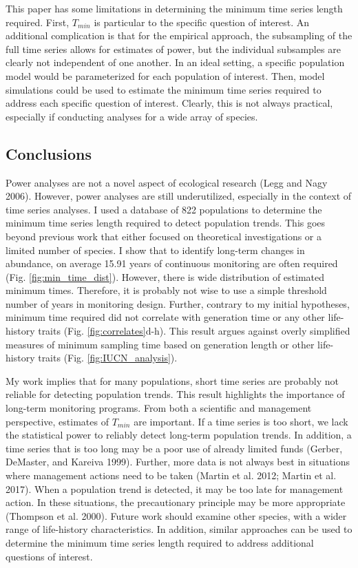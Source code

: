 \documentclass[12pt,]{article}
\begin{document}
This paper has some limitations in determining the minimum time series
length required. First, \(T_{min}\) is particular to the specific
question of interest. An additional complication is that for the
empirical approach, the subsampling of the full time series allows for
estimates of power, but the individual subsamples are clearly not
independent of one another. In an ideal setting, a specific population
model would be parameterized for each population of interest. Then,
model simulations could be used to estimate the minimum time series
required to address each specific question of interest. Clearly, this is
not always practical, especially if conducting analyses for a wide array
of species.

\subsection{Conclusions}\label{conclusions}

Power analyses are not a novel aspect of ecological research (Legg and
Nagy 2006). However, power analyses are still underutilized, especially
in the context of time series analyses. I used a database of 822
populations to determine the minimum time series length required to
detect population trends. This goes beyond previous work that either
focused on theoretical investigations or a limited number of species. I
show that to identify long-term changes in abundance, on average 15.91
years of continuous monitoring are often required (Fig.
\ref{fig:min_time_dist}). However, there is wide distribution of
estimated minimum times. Therefore, it is probably not wise to use a
simple threshold number of years in monitoring design. Further, contrary
to my initial hypotheses, minimum time required did not correlate with
generation time or any other life-history traits (Fig.
\ref{fig:correlates}d-h). This result argues against overly simplified
measures of minimum sampling time based on generation length or other
life-history traits (Fig. \ref{fig:IUCN_analysis}).

My work implies that for many populations, short time series are
probably not reliable for detecting population trends. This result
highlights the importance of long-term monitoring programs. From both a
scientific and management perspective, estimates of \(T_{min}\) are
important. If a time series is too short, we lack the statistical power
to reliably detect long-term population trends. In addition, a time
series that is too long may be a poor use of already limited funds
(Gerber, DeMaster, and Kareiva 1999). Further, more data is not always
best in situations where management actions need to be taken (Martin et
al. 2012; Martin et al. 2017). When a population trend is detected, it
may be too late for management action. In these situations, the
precautionary principle may be more appropriate (Thompson et al. 2000).
Future work should examine other species, with a wider range of
life-history characteristics. In addition, similar approaches can be
used to determine the minimum time series length required to address
additional questions of interest.
\end{document}
